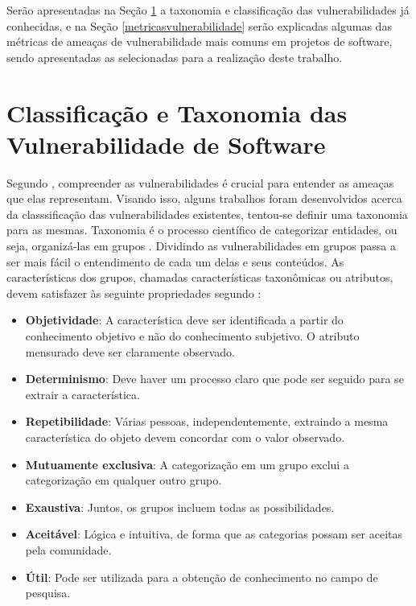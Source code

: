 Serão apresentadas na Seção \ref{cwe} a taxonomia e classificação das
vulnerabilidades já conhecidas, e na Seção \ref{metricasvulnerabilidade} serão
explicadas algumas das métricas de ameaças de vulnerabilidade mais comuns em
projetos de software, sendo apresentadas as selecionadas para a realização deste
trabalho.

\section{Classificação e Taxonomia das Vulnerabilidade de Software}\label{cwe}

Segundo , compreender as vulnerabilidades é
crucial para entender as ameaças que elas representam. Visando isso, alguns
trabalhos foram desenvolvidos acerca da classsificação das vulnerabilidades
existentes, tentou-se definir uma taxonomia para as mesmas. Taxonomia é o
processo científico de categorizar entidades, ou seja, organizá-las em grupos
\cite{gregio:2005}. Dividindo as vulnerabilidades em grupos passa a ser mais
fácil o entendimento de cada um delas e seus conteúdos. As características dos
grupos, chamadas características taxonômicas ou atributos, devem satisfazer às
seguinte propriedades segundo : 

\begin{itemize}
  \item \textbf{Objetividade}: A característica deve ser identificada a partir
    do conhecimento objetivo e não do conhecimento subjetivo. O atributo
    mensurado deve ser claramente observado.

  \item \textbf{Determinismo}: Deve haver um processo claro que pode ser seguido
    para se extrair a característica.

  \item \textbf{Repetibilidade}: Várias pessoas, independentemente, extraindo a
    mesma característica do objeto devem concordar com o valor observado.

  \item \textbf{Mutuamente exclusiva}: A categorização em um grupo exclui a
    categorização em qualquer outro grupo.

  \item \textbf{Exaustiva}: Juntos, os grupos incluem todas as possibilidades.

  \item \textbf{Aceitável}: Lógica e intuitiva, de forma que as categorias
    possam ser aceitas pela comunidade.

  \item \textbf{Útil}: Pode ser utilizada para a obtenção de conhecimento no
    campo de pesquisa.
\end{itemize}

